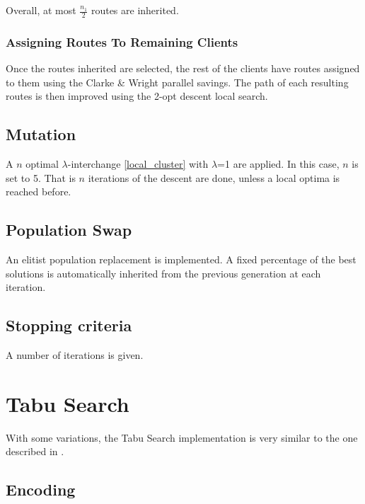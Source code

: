 \documentclass{article} %
\begin{document}
Overall, at most $\frac{n_1}{2}$ routes are inherited.

\subsubsection{Assigning Routes To Remaining Clients}

Once the routes inherited are selected, the rest of the clients have routes assigned to them using the Clarke \& Wright parallel savings. The path of each resulting routes is then improved using the 2-opt descent local search.


\subsection{Mutation}

A $n$ optimal $\lambda$-interchange \ref{local_cluster} with $\lambda$=1 are applied. In this case, $n$ is set to 5. That is $n$ iterations of the descent are done, unless a local optima is reached before.


\subsection{Population Swap}

An elitist population replacement is implemented. A fixed percentage of the best solutions is automatically inherited from the previous generation at each iteration.


\subsection{Stopping criteria}

A number of iterations is given.


\newpage
\section{Tabu Search}
\label{tabu_search}

With some variations, the Tabu Search implementation is very similar to the one described in \citep{osman1993}.


\subsection{Encoding}
\end{document}
